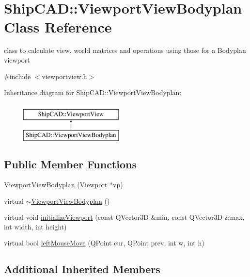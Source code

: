 \hypertarget{classShipCAD_1_1ViewportViewBodyplan}{\section{Ship\-C\-A\-D\-:\-:Viewport\-View\-Bodyplan Class Reference}
\label{classShipCAD_1_1ViewportViewBodyplan}
}


class to calculate view, world matrices and operations using those for a Bodyplan viewport  




{\ttfamily \#include $<$viewportview.\-h$>$}

Inheritance diagram for Ship\-C\-A\-D\-:\-:Viewport\-View\-Bodyplan\-:\begin{figure}[H]
\begin{center}
\leavevmode
\includegraphics[height=2.000000cm]{classShipCAD_1_1ViewportViewBodyplan}
\end{center}
\end{figure}
\subsection*{Public Member Functions}
\begin{DoxyCompactItemize}
\item 
\hyperlink{classShipCAD_1_1ViewportViewBodyplan_af7c21d420e2764eca26a1b2905fc0a9c}{Viewport\-View\-Bodyplan} (\hyperlink{classShipCAD_1_1Viewport}{Viewport} $\ast$vp)
\item 
virtual \hyperlink{classShipCAD_1_1ViewportViewBodyplan_a0e5644ebc58b2b6ca144c3c1e81c826e}{$\sim$\-Viewport\-View\-Bodyplan} ()
\item 
virtual void \hyperlink{classShipCAD_1_1ViewportViewBodyplan_aaa33b893fbff1c2899d5779fc3b78d1e}{initialize\-Viewport} (const Q\-Vector3\-D \&min, const Q\-Vector3\-D \&max, int width, int height)
\item 
virtual bool \hyperlink{classShipCAD_1_1ViewportViewBodyplan_a7006e77fb3b8470c418bc75528d0ad1b}{left\-Mouse\-Move} (Q\-Point cur, Q\-Point prev, int w, int h)
\end{DoxyCompactItemize}
\subsection*{Additional Inherited Members}


